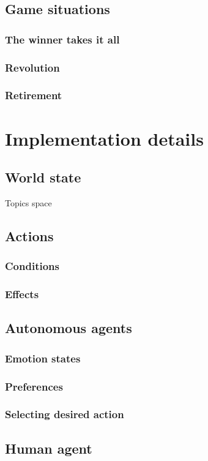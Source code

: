 \documentclass[11pt,a4paper]{article}
\begin{document}
\subsection{Game situations}
  \subsubsection{The winner takes it all}
  \subsubsection{Revolution}
  \subsubsection{Retirement}
\section{Implementation details}
  \subsection{World state}
  Topics space
  \subsection{Actions}
    \subsubsection{Conditions}
    \subsubsection{Effects}
  \subsection{Autonomous agents}
    \subsubsection{Emotion states}
    \subsubsection{Preferences}
    \subsubsection{Selecting desired action}
  \subsection{Human agent}
\end{document}
